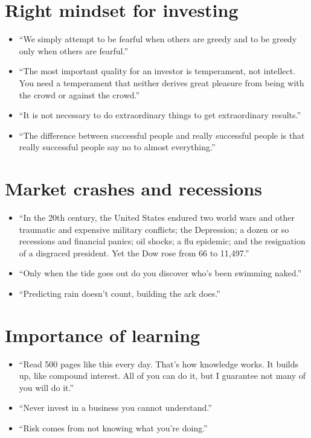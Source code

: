 \documentclass[
]{book}
\begin{document}
\hypertarget{right-mindset-for-investing}{%
\section{Right mindset for investing}\label{right-mindset-for-investing}}

\begin{itemize}
\item
  ``We simply attempt to be fearful when others are greedy and to be greedy only when others are fearful.''
\item
  ``The most important quality for an investor is temperament, not intellect. You need a temperament that neither derives great pleasure from being with the crowd or against the crowd.''
\item
  ``It is not necessary to do extraordinary things to get extraordinary results.''
\item
  ``The difference between successful people and really successful people is that really successful people say no to almost everything.''
\end{itemize}

\hypertarget{market-crashes-and-recessions}{%
\section{Market crashes and recessions}\label{market-crashes-and-recessions}}

\begin{itemize}
\item
  ``In the 20th century, the United States endured two world wars and other traumatic and expensive military conflicts; the Depression; a dozen or so recessions and financial panics; oil shocks; a flu epidemic; and the resignation of a disgraced president. Yet the Dow rose from 66 to 11,497.''
\item
  ``Only when the tide goes out do you discover who's been swimming naked.''
\item
  ``Predicting rain doesn't count, building the ark does.''
\end{itemize}

\hypertarget{importance-of-learning}{%
\section{Importance of learning}\label{importance-of-learning}}

\begin{itemize}
\item
  ``Read 500 pages like this every day. That's how knowledge works. It builds up, like compound interest. All of you can do it, but I guarantee not many of you will do it.''
\item
  ``Never invest in a business you cannot understand.''
\item
  ``Risk comes from not knowing what you're doing.''
\end{itemize}
\end{document}
